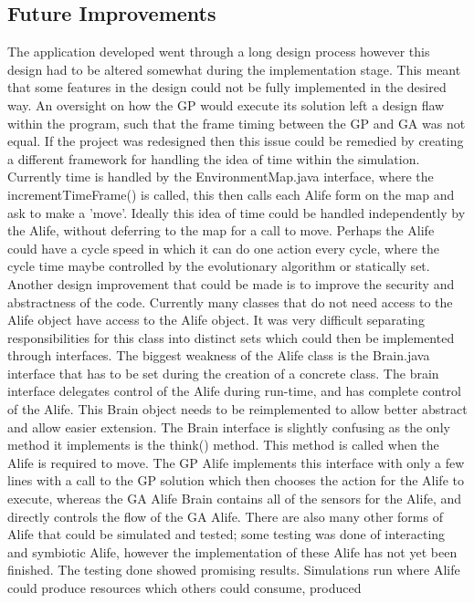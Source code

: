\documentclass[12pt]{article}
\begin{document}
\subsection{Future Improvements}
The application developed went through a long design process however this design had to be altered somewhat during the implementation stage. This meant that some
features in the design could not be fully implemented in the desired way. An oversight on how the GP would execute its solution left a design flaw within the program,
such that the frame timing between the GP and GA was not equal. If the project was redesigned then this issue could be remedied by creating a different framework for
handling the idea of time within the simulation. Currently time is handled by the EnvironmentMap.java interface, where the incrementTimeFrame() is called, this then
calls each Alife form on the map and ask to make a 'move'. Ideally this idea of time could be handled independently by the Alife, without deferring to the map for
a call to move. Perhaps the Alife could have a cycle speed in which it can do one action every cycle, where the cycle time maybe controlled by the evolutionary algorithm
or statically set. 
Another design improvement that could be made is to improve the security and abstractness of the code. Currently many classes that do not need access to the Alife
object have access to the Alife object. It was very difficult separating responsibilities for this class into distinct sets which could then be implemented through
interfaces. The biggest weakness of the Alife class is the Brain.java interface that has to be set during the creation of a concrete class. The brain interface
delegates control of the Alife during run-time, and has complete control of the Alife. This Brain object needs to be reimplemented to allow better abstract and allow
easier extension. The Brain interface is slightly confusing as the only method it implements is the think() method. This method is called when the Alife is required to
move. The GP Alife implements this interface with only a few lines with a call to the GP solution which then chooses the action for the Alife to execute, whereas the
GA Alife Brain contains all of the sensors for the Alife, and directly controls the flow of the GA Alife.
There are also many other forms of Alife that could be simulated and tested; some testing was done of interacting and symbiotic Alife, however the implementation of
these Alife has not yet been finished. The testing done showed promising results. Simulations run where Alife could produce resources which others could consume, produced
\end{document}

